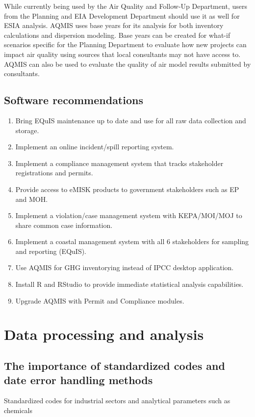 While currently being used by the Air Quality and Follow-Up  Department, users from the Planning and EIA Development Department should use it as well for ESIA analysis. AQMIS uses base years for its analysis for both inventory calculations and dispersion modeling. Base years can be created for what-if scenarios specific for the Planning Department to evaluate how new projects can impact air quality using sources that local consultants may not have access to. AQMIS can also be used to evaluate the quality of air model results submitted by consultants.

\subsection{Software recommendations}
\begin{enumerate}
\item Bring EQuIS maintenance up to date and use for all raw data collection and storage.
\item Implement an online incident/spill reporting system. 
\item Implement a compliance management system that tracks stakeholder registrations and permits.
\item Provide access to eMISK products to government stakeholders such as EP and MOH.
\item Implement a violation/case management system with KEPA/MOI/MOJ to share common case information.
\item Implement a coastal management system with all 6 stakeholders for sampling and reporting (EQuIS).
\item Use AQMIS for GHG inventorying instead of IPCC desktop application.
\item Install R and RStudio to provide immediate statistical analysis capabilities.
\item Upgrade AQMIS with Permit and Compliance modules.
\end{enumerate}

\section{Data processing and analysis}

\subsection{The importance of  standardized codes and date error handling methods}
Standardized codes for industrial sectors and analytical parameters such as chemicals 

